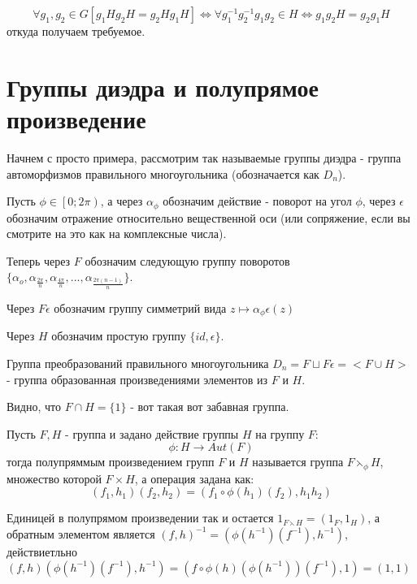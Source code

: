 \begin{Proof}
\[
	\forall g_1, g_2 \in G \left[g_1 H g_2 H = g_2 H g_1 H\right] \Leftrightarrow \forall g_1^{-1}g_2^{-1}g_1g_2 \in H \Leftrightarrow g_1 g_2 H = g_2 g_1 H
\]
откуда получаем требуемое.
\end{Proof}

\section{Группы диэдра и полупрямое произведение}

Начнем с просто примера, рассмотрим так называемые группы диэдра - группа автоморфизмов правильного многоугольника (обозначается как $D_n$).

Пусть $\phi \in \left[\left. 0; 2\pi\right)\right.$, а через $\alpha_\phi$ обозначим действие - поворот на угол $\phi$, через $\epsilon$ обозначим отражение относительно вещественной оси (или сопряжение, если вы смотрите на это как на комплексные числа).

Теперь через $F$ обозначим следующую группу поворотов $\lbrace \alpha_o, \alpha_{\frac{2\pi}{n}}, \alpha_{\frac{4\pi}{n}}, ... , \alpha_{\frac{2\pi\left(n-1\right)}{n}}\rbrace$.

Через $F\epsilon$ обозначим группу симметрий вида $z \mapsto \alpha_{\phi} \epsilon\left(z\right)$

Через $H$ обозначим простую группу $\lbrace id, \epsilon \rbrace$.

Группа преобразований правильного многоугольника $D_n = F \sqcup F\epsilon = <F \cup H>$ - группа образованная произведениями элементов из $F$ и $H$.

Видно, что $F\cap H = \lbrace 1 \rbrace$ - вот такая вот забавная группа.

\begin{Def}
Пусть $F,H$ - группа и задано действие группы $H$ на группу $F$:
\[
	\phi : H \rightarrow Aut\left(F\right)
\]
тогда полупряммым произведением групп $F$ и $H$ называется группа $F \leftthreetimes_\phi H$, множество которой $F \times H$, а операция задана как:
\[
	\left(f_1, h_1\right)\left(f_2, h_2\right) = \left(f_1 \circ \phi\left(h_1\right)\left(f_2\right), h_1h_2\right)
\]
\end{Def}

Единицей в полупрямом произведении так и остается $1_{F \leftthreetimes H} = \left(1_F,1_H\right)$, а обратным элементом является $\left(f,h\right)^{-1} = \left(\phi\left(h^{-1}\right)\left(f^{-1}\right), h^{-1}\right)$, действиетльно $\left(f,h\right)\left(\phi\left(h^{-1}\right)\left(f^{-1}\right),h^{-1}\right) = \left(f\circ\phi\left(h\right)\left(\phi\left(h^{-1}\right)\right)\left(f^{-1}\right),1\right) = \left(1, 1\right)$

